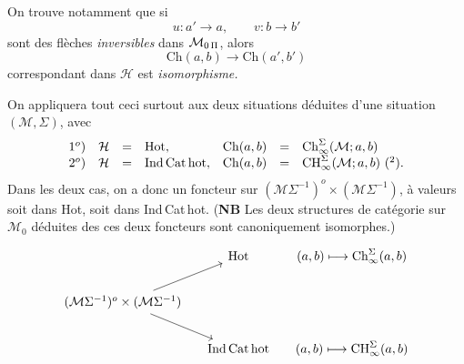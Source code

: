 On trouve notamment que si
\[
u : a'\longrightarrow a, \qquad v : b\longrightarrow b'
\]
sont des flèches \textit{inversibles} dans $\mathcal{M}_{0\,\Pi}$, alors
\[
\mathrm{Ch}(a,b)\longrightarrow\mathrm{Ch}(a',b')
\]
correspondant dans $\mathcal{H}$ est \textit{isomorphisme.}

On appliquera tout ceci surtout aux deux situations déduites d'une situation $(\mathcal{M},\Sigma)$, avec
\[
\begin{array}{rlcllcl}
1^o) & \mathcal{H} & = & \mathrm{Hot}, & \mathrm{Ch}(a,b) & = & \mathrm{Ch}^{\Sigma}_{\infty}(\mathcal{M};a,b)\\
2^o) & \mathcal{H} & = & \mathrm{Ind\,Cat\,hot}, & \mathrm{Ch}(a,b) & = & \mathrm{CH}^{\Sigma}_{\infty}(\mathcal{M};a,b)\ \text{(\footnotemark[2])}.
\end{array}
\]
Dans les deux cas, on a donc un foncteur sur $(\mathcal{M}\Sigma^{-1})^o\times(\mathcal{M}\Sigma^{-1})$, à valeurs soit dans Hot, soit dans Ind\,Cat\,hot. (\textbf{NB} Les deux structures de catégorie sur $\mathcal{M}_0$ déduites des %
ces deux foncteurs sont canoniquement isomorphes.)
\[
\begin{tikzcd}[column sep=small]
 & \mathrm{Hot} & (a,b)\longmapsto\mathrm{Ch}^{\Sigma}_{\infty}(a,b)\\
(\mathcal{M}\Sigma^{-1})^o\times(\mathcal{M}\Sigma^{-1}) \arrow[ur] \arrow[dr] & & \\
 & \mathrm{Ind\,Cat\,hot} & (a,b)\longmapsto\mathrm{CH}^{\Sigma}_{\infty}(a,b)
\end{tikzcd}
\]

